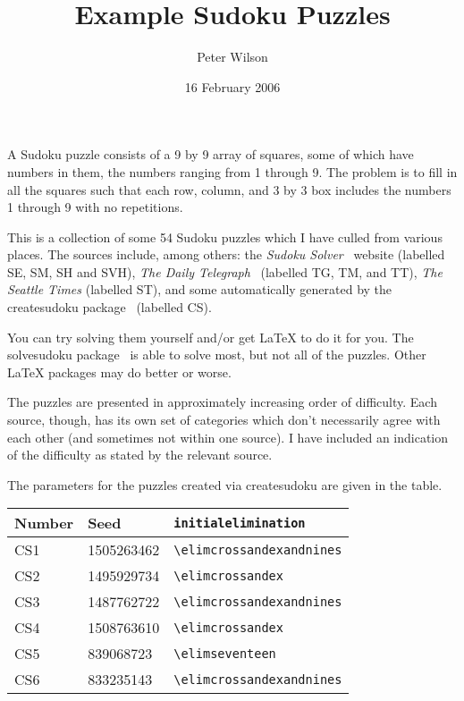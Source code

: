 \documentclass[twoside]{article}
\title{Example Sudoku Puzzles}
\author{Peter Wilson}
\date{16 February 2006}
\newcommand*{\Lpack}[1]{\textsf{#1}}
\begin{document}
\maketitle

    A Sudoku puzzle consists of a 9 by 9 array of squares, some of which have
numbers in them, the numbers ranging from 1 through 9. The problem is to
fill in all the squares such that each row, column, and 3 by 3 box includes
the numbers 1 through 9 with no repetitions.

    This is a collection of some 54 Sudoku puzzles which I have culled
from various places. The sources include, among others:
the \emph{Sudoku Solver}~\cite{SSBL} website (labelled SE, SM, SH and SVH),
\emph{The Daily Telegraph}~\cite{DT2} (labelled TG, TM, and TT),
\emph{The Seattle Times} (labelled ST),
and some automatically generated by the \Lpack{createsudoku}
package~\cite{SUDOKUBUNDLE} (labelled CS).

You can try solving them yourself and/or get
LaTeX to do it for
you. The \Lpack{solvesudoku} package~\cite{SUDOKUBUNDLE} is able to solve
most, but not all of the puzzles. Other LaTeX packages may do better or worse.

    The puzzles are presented in approximately increasing order of difficulty.
Each source, though, has its own set of categories which don't necessarily
agree with each other (and sometimes not within one source). I have included
an indication of the difficulty as stated by the relevant source.

The parameters for the puzzles created via \Lpack{createsudoku} are given in
the table.

\begin{table}[hbp]
\centering
\begin{tabular}{lll} \hline
Number & Seed & \verb?initialelimination? \\ \hline
CS1    & 1505263462 & \verb?\elimcrossandexandnines? \\
CS2    & 1495929734 & \verb?\elimcrossandex? \\
CS3    & 1487762722 & \verb?\elimcrossandexandnines? \\
CS4    & 1508763610 & \verb?\elimcrossandex? \\
CS5    & 839068723  & \verb?\elimseventeen? \\
CS6    & 833235143  & \verb?\elimcrossandexandnines? \\ \hline
\end{tabular}
\end{table}
\end{document}
